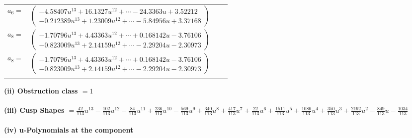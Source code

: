 \documentclass[1p]{elsarticle_modified}
\theoremstyle{definition}
\begin{document}
\begin{tabular}{m{7pt} m{180pt} m{7pt} m{180pt} }
\flushright $a_{6}=$&$\begin{pmatrix}-4.58407 u^{13}+16.1327 u^{12}+\cdots-24.3363 u+3.52212\\-0.212389 u^{13}+1.23009 u^{12}+\cdots-5.84956 u+3.37168\end{pmatrix}$ \\
\flushright $a_{8}=$&$\begin{pmatrix}-1.70796 u^{13}+4.43363 u^{12}+\cdots+0.168142 u-3.76106\\-0.823009 u^{13}+2.14159 u^{12}+\cdots-2.29204 u-2.30973\end{pmatrix}$\\ \flushright $a_{8}=$&$\begin{pmatrix}-1.70796 u^{13}+4.43363 u^{12}+\cdots+0.168142 u-3.76106\\-0.823009 u^{13}+2.14159 u^{12}+\cdots-2.29204 u-2.30973\end{pmatrix}$\\&\end{tabular}
\flushleft \textbf{(ii) Obstruction class $= 1$}\\~\\
\flushleft \textbf{(iii) Cusp Shapes $= \frac{42}{113} u^{13}-\frac{102}{113} u^{12}-\frac{84}{113} u^{11}+\frac{236}{113} u^{10}-\frac{569}{113} u^9+\frac{340}{113} u^8+\frac{417}{113} u^7+\frac{22}{113} u^6+\frac{1511}{113} u^5+\frac{1086}{113} u^4+\frac{350}{113} u^3+\frac{2192}{113} u^2-\frac{849}{113} u-\frac{1034}{113}$}\\~\\
\newpage\renewcommand{\arraystretch}{1}
\flushleft \textbf{(iv) u-Polynomials at the component}\newline \\
\end{document}
